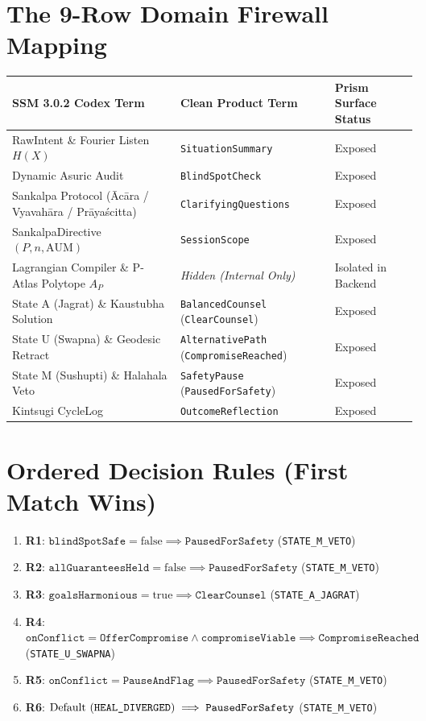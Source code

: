 \documentclass[11pt,a4paper]{article}
\begin{document}
\section{The 9-Row Domain Firewall Mapping}
\begin{center}
\begin{tabular}{@{}lll@{}}
\toprule
\textbf{SSM 3.0.2 Codex Term} & \textbf{Clean Product Term} & \textbf{Prism Surface Status} \\
\midrule
RawIntent \& Fourier Listen $H(X)$ & \texttt{SituationSummary} & Exposed \\
Dynamic Asuric Audit & \texttt{BlindSpotCheck} & Exposed \\
Sankalpa Protocol (\={A}c\={a}ra / Vyavah\={a}ra / Pr\={a}ya\'{s}citta) & \texttt{ClarifyingQuestions} & Exposed \\
SankalpaDirective $(P, n, \mathrm{AUM})$ & \texttt{SessionScope} & Exposed \\
Lagrangian Compiler \& P-Atlas Polytope $A_P$ & \emph{Hidden (Internal Only)} & Isolated in Backend \\
State A (Jagrat) \& Kaustubha Solution & \texttt{BalancedCounsel} (\texttt{ClearCounsel}) & Exposed \\
State U (Swapna) \& Geodesic Retract & \texttt{AlternativePath} (\texttt{CompromiseReached}) & Exposed \\
State M (Sushupti) \& Halahala Veto & \texttt{SafetyPause} (\texttt{PausedForSafety}) & Exposed \\
Kintsugi CycleLog & \texttt{OutcomeReflection} & Exposed \\
\bottomrule
\end{tabular}
\end{center}

\section{Ordered Decision Rules (First Match Wins)}
\begin{enumerate}
  \item \textbf{R1}: $\texttt{blindSpotSafe} = \mathrm{false} \implies \texttt{PausedForSafety}$ (\texttt{STATE\_M\_VETO})
  \item \textbf{R2}: $\texttt{allGuaranteesHeld} = \mathrm{false} \implies \texttt{PausedForSafety}$ (\texttt{STATE\_M\_VETO})
  \item \textbf{R3}: $\texttt{goalsHarmonious} = \mathrm{true} \implies \texttt{ClearCounsel}$ (\texttt{STATE\_A\_JAGRAT})
  \item \textbf{R4}: $\texttt{onConflict} = \texttt{OfferCompromise} \land \texttt{compromiseViable} \implies \texttt{CompromiseReached}$ (\texttt{STATE\_U\_SWAPNA})
  \item \textbf{R5}: $\texttt{onConflict} = \texttt{PauseAndFlag} \implies \texttt{PausedForSafety}$ (\texttt{STATE\_M\_VETO})
  \item \textbf{R6}: $\text{Default (\texttt{HEAL\_DIVERGED})} \implies \texttt{PausedForSafety}$ (\texttt{STATE\_M\_VETO})
\end{enumerate}
\end{document}
